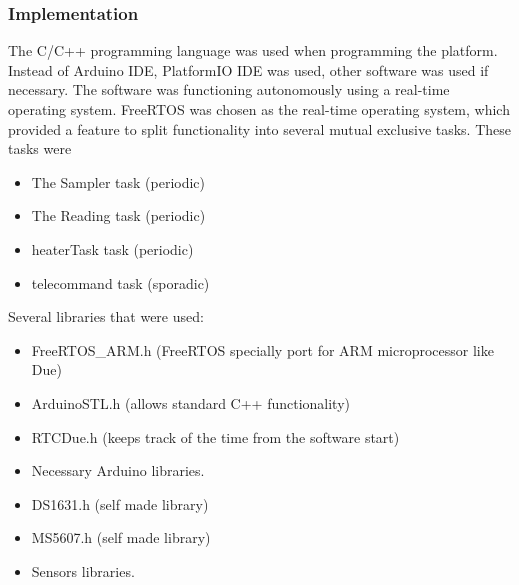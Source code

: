 \subsubsection{Implementation}\label{sec:4.8.3}
The C/C++ programming language was used when programming the platform. Instead of Arduino IDE, PlatformIO IDE was used, other software was used if necessary. The software was functioning autonomously using a real-time operating system. FreeRTOS was chosen as the real-time operating system, which provided a feature to split functionality into several mutual exclusive tasks. These tasks were \begin{itemize}
    \item The Sampler task (periodic)
    \item The Reading task (periodic)
    \item heaterTask task (periodic)
    \item telecommand task (sporadic)
\end{itemize} 
Several libraries that were used:
\begin{itemize}
    \item FreeRTOS\_ARM.h (FreeRTOS specially port for ARM microprocessor like Due)
    \item ArduinoSTL.h (allows standard C++ functionality)
    \item RTCDue.h (keeps track of the time from the software start)
    \item Necessary Arduino libraries.
    \item DS1631.h (self made library)
    \item MS5607.h (self made library)
    \item Sensors libraries.
\end{itemize}


\raggedbottom